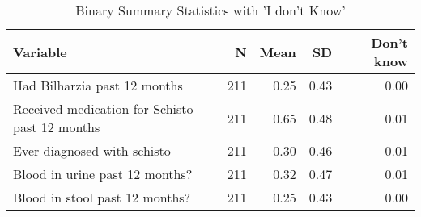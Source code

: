 \begin{table}[!t]
\caption*{
{\large Binary Summary Statistics with 'I don't Know'}
} 
\fontsize{12.0pt}{14.4pt}\selectfont
\begin{tabular*}{\linewidth}{@{\extracolsep{\fill}}lrrrr}
\toprule
Variable & N & Mean & SD & Don't know \\ 
\midrule\addlinespace[2.5pt]
Had Bilharzia past 12 months & 211 & 0.25 & 0.43 & 0.00 \\ 
Received medication for Schisto past 12 months & 211 & 0.65 & 0.48 & 0.01 \\ 
Ever diagnosed with schisto & 211 & 0.30 & 0.46 & 0.01 \\ 
Blood in urine past 12 months? & 211 & 0.32 & 0.47 & 0.01 \\ 
Blood in stool past 12 months? & 211 & 0.25 & 0.43 & 0.00 \\ 
\bottomrule
\end{tabular*}
\end{table}

